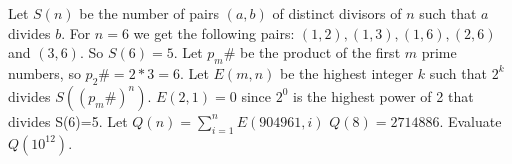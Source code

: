Let $S(n)$ be the number of pairs $(a,b)$ of distinct divisors of $n$ such that $a$ divides $b$.
For $n=6$ we get the following pairs: $(1,2), (1,3), (1,6),( 2,6)$ and $(3,6)$. So $S(6)=5$.
Let $p_m\#$ be the product of the first $m$ prime numbers,  so $p_2\# = 2*3 = 6$.
Let $E(m, n)$ be the highest integer $k$ such that $2^k$ divides $S((p_m\#)^n)$.
$E(2,1) = 0$ since $2^0$ is the highest power of 2 that divides S(6)=5.
Let $Q(n)=\sum_{i=1}^{n} E(904961, i)$
$Q(8)=2714886$.
Evaluate $Q(10^{12})$. 
